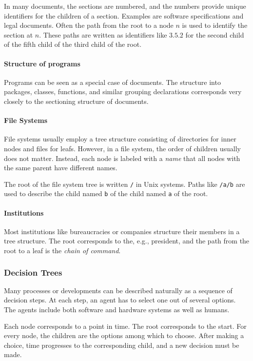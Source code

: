 In many documents, the sections are numbered, and the numbers provide unique identifiers for the children of a section.
Examples are software specifications and legal documents.
Often the path from the root to a node $n$ is used to identify the section at $n$. These paths are written as identifiers like $3.5.2$ for the second child of the fifth child of the third child of the root.

\paragraph{Structure of programs}
Programs can be seen as a special case of documents.
The structure into packages, classes, functions, and similar grouping declarations corresponds very closely to the sectioning structure of documents.

\paragraph{File Systems}
File systems usually employ a tree structure consisting of directories for inner nodes and files for leafs.
However, in a file system, the order of children usually does not matter. Instead, each node is labeled with a \emph{name} that all nodes with the same parent have different names.

The root of the file system tree is written \texttt{/} in Unix systems.
Paths like \texttt{/a/b} are used to describe the child named \texttt{b} of the child named \texttt{a} of the root.

\paragraph{Institutions}
Most institutions like bureaucracies or companies structure their members in a tree structure.
The root corresponds to the, e.g., president, and the path from the root to a leaf is the \emph{chain of command}.

\subsubsection{Decision Trees}

Many processes or developments can be described naturally as a sequence of decision steps.
At each step, an agent has to select one out of several options.
The agents include both software and hardware systems as well as humans.

Each node corresponds to a point in time.
The root corresponds to the start.
For every node, the children are the options among which to choose.
After making a choice, time progresses to the corresponding child, and a new decision must be made.

